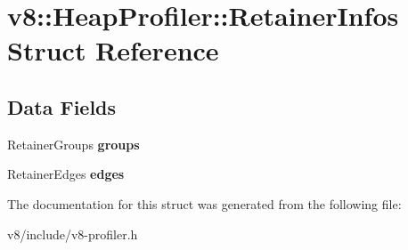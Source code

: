\hypertarget{structv8_1_1HeapProfiler_1_1RetainerInfos}{}\section{v8\+:\+:Heap\+Profiler\+:\+:Retainer\+Infos Struct Reference}
\label{structv8_1_1HeapProfiler_1_1RetainerInfos}
\subsection*{Data Fields}
\begin{DoxyCompactItemize}
\item 
\mbox{\label{structv8_1_1HeapProfiler_1_1RetainerInfos_ac955e4c7a262b0d374e70d6229d5b672}} 
Retainer\+Groups {\bfseries groups}
\item 
\mbox{\label{structv8_1_1HeapProfiler_1_1RetainerInfos_a30a98dbe97c3b3462f1737e15debaedc}} 
Retainer\+Edges {\bfseries edges}
\end{DoxyCompactItemize}


The documentation for this struct was generated from the following file\+:\begin{DoxyCompactItemize}
\item 
v8/include/v8-\/profiler.\+h\end{DoxyCompactItemize}
